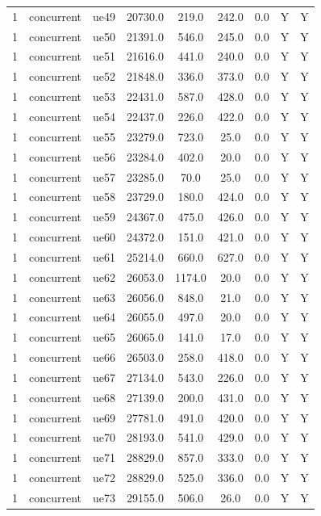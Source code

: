 \begin{table}[ht]
\begin{tabular}{|c|c|c|c|c|c|c|c|c|}
1 & concurrent & ue49 & 20730.0 & 219.0 & 242.0 & 0.0 & Y & Y \\
1 & concurrent & ue50 & 21391.0 & 546.0 & 245.0 & 0.0 & Y & Y \\
1 & concurrent & ue51 & 21616.0 & 441.0 & 240.0 & 0.0 & Y & Y \\
1 & concurrent & ue52 & 21848.0 & 336.0 & 373.0 & 0.0 & Y & Y \\
1 & concurrent & ue53 & 22431.0 & 587.0 & 428.0 & 0.0 & Y & Y \\
1 & concurrent & ue54 & 22437.0 & 226.0 & 422.0 & 0.0 & Y & Y \\
1 & concurrent & ue55 & 23279.0 & 723.0 & 25.0 & 0.0 & Y & Y \\
1 & concurrent & ue56 & 23284.0 & 402.0 & 20.0 & 0.0 & Y & Y \\
1 & concurrent & ue57 & 23285.0 & 70.0 & 25.0 & 0.0 & Y & Y \\
1 & concurrent & ue58 & 23729.0 & 180.0 & 424.0 & 0.0 & Y & Y \\
1 & concurrent & ue59 & 24367.0 & 475.0 & 426.0 & 0.0 & Y & Y \\
1 & concurrent & ue60 & 24372.0 & 151.0 & 421.0 & 0.0 & Y & Y \\
1 & concurrent & ue61 & 25214.0 & 660.0 & 627.0 & 0.0 & Y & Y \\
1 & concurrent & ue62 & 26053.0 & 1174.0 & 20.0 & 0.0 & Y & Y \\
1 & concurrent & ue63 & 26056.0 & 848.0 & 21.0 & 0.0 & Y & Y \\
1 & concurrent & ue64 & 26055.0 & 497.0 & 20.0 & 0.0 & Y & Y \\
1 & concurrent & ue65 & 26065.0 & 141.0 & 17.0 & 0.0 & Y & Y \\
1 & concurrent & ue66 & 26503.0 & 258.0 & 418.0 & 0.0 & Y & Y \\
1 & concurrent & ue67 & 27134.0 & 543.0 & 226.0 & 0.0 & Y & Y \\
1 & concurrent & ue68 & 27139.0 & 200.0 & 431.0 & 0.0 & Y & Y \\
1 & concurrent & ue69 & 27781.0 & 491.0 & 420.0 & 0.0 & Y & Y \\
1 & concurrent & ue70 & 28193.0 & 541.0 & 429.0 & 0.0 & Y & Y \\
1 & concurrent & ue71 & 28829.0 & 857.0 & 333.0 & 0.0 & Y & Y \\
1 & concurrent & ue72 & 28829.0 & 525.0 & 336.0 & 0.0 & Y & Y \\
1 & concurrent & ue73 & 29155.0 & 506.0 & 26.0 & 0.0 & Y & Y \\

\end{tabular}
\end{table}
